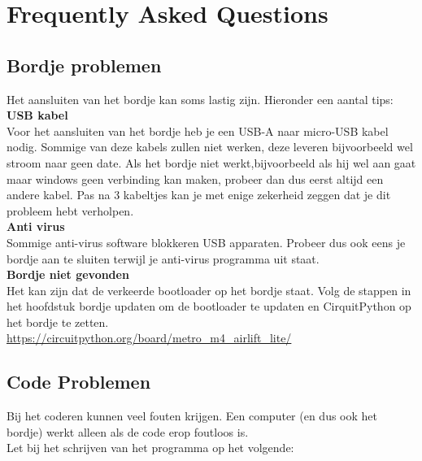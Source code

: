 \chapter{Frequently Asked Questions}

\section{Bordje problemen}

Het aansluiten van het bordje kan soms lastig zijn. Hieronder een aantal tips: \\

\noindent \textbf{USB kabel} \\

Voor het aansluiten van het bordje heb je een USB-A naar micro-USB kabel nodig. Sommige van deze kabels zullen niet werken, deze leveren bijvoorbeeld wel stroom naar geen date. Als het bordje niet werkt,bijvoorbeeld als hij wel aan gaat maar windows geen verbinding kan maken, probeer dan dus eerst altijd een andere kabel. Pas na 3 kabeltjes kan je met enige zekerheid zeggen dat je dit probleem hebt verholpen. \\

\noindent \textbf{Anti virus} \\

Sommige anti-virus software blokkeren USB apparaten. Probeer dus ook eens je bordje aan te sluiten terwijl je anti-virus programma uit staat.\\

\noindent \textbf{Bordje niet gevonden} \\

Het kan zijn dat de verkeerde bootloader op het bordje staat. Volg de stappen in het hoofdstuk bordje updaten om de bootloader te updaten en CirquitPython op het bordje te zetten. \\

\url{https://circuitpython.org/board/metro_m4_airlift_lite/}

\clearpage
\newpage

\section{Code Problemen}

Bij het coderen kunnen veel fouten krijgen. Een computer (en dus ook het bordje) werkt alleen als de code erop foutloos is. \\

Let bij het schrijven van het programma op het volgende: \\

